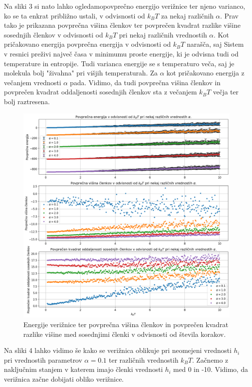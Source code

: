 \documentclass[slovene,11pt,a4paper]{article}
\begin{document}
Na sliki 3 si nato lahko ogledamopovprečno energijo verižnice ter njeno varianco, ko se ta enkrat približno ustali, v odvisnosti od $k_BT$ za nekaj različnih $\alpha$. Prav tako je prikazana povprečna višina členkov ter povprečen kvadrat razlike višine sosednjih členkov v odvisnosti od $k_BT$ pri nekaj različnih vrednostih $\alpha$. Kot pričakovano energija povprečna energija v odvisnosti od $k_BT$ narašča, saj Sistem v resnici preživi največ časa v minimumu proste energije, ki je odvisna tudi od temperature in entropije. Tudi varianca energije se s temperaturo veča, saj je molekula bolj "živahna" pri višjih temperaturah. Za $\alpha$ kot pričakovano energija z večanjem vrednosti $\alpha$ pada. Vidimo, da tudi povprečna višina členkov in povprečen kvadrat oddaljenosti sosednjih členkov sta z večanjem $k_BT$ večja ter bolj raztresena.

\newpage

\begin{figure}[h!]
\centering
\includegraphics[width=\linewidth]{veriznica3.png}
\caption{Energije verižnice ter povprečna višina členkov in povprečen kvadrat razlike višine med sosednjimi členki v odvisnosti od števila korakov.}
\end{figure}

Na sliki 4 lahko vidimo še kako se verižnica oblikuje pri neomejeni vrednosti $h_i$ pri vrednostih parametrov $\alpha=0.1$ ter različnih vrednostih $k_BT$. Začnemo z naključnim stanjem v katerem imajo členki vrednosti $h_i$ med 0 in -10. Vidimo, da verižnica začne dobijati obliko verižnice.
\end{document}
